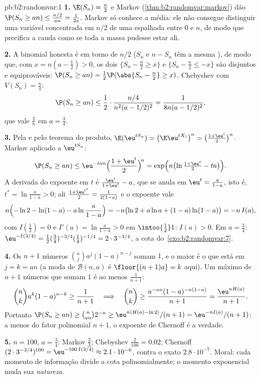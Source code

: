 \begin{solution}{pb:b2:randomvar:1}
\textbf{1.} $\E(S_n) = \frac n2$ e Markov
(\cref{thm:b2:randomvar:markov}) dão $\P(S_n \geq an) \leq
\frac{n/2}{an} = \frac1{2a}$. Markov só conhece a média: ele
não consegue distinguir uma variável concentrada em $n/2$ de uma
espalhada entre $0$ e $n$, de modo que precifica a cauda como se toda
a massa pudesse estar ali.

\textbf{2.} A binomial honesta é  em torno de $n/2$
($S_n$ e $n - S_n$ têm a mesma ), de modo que, com $x = n(a -
\frac12) > 0$, os dois  $\{S_n - \frac n2 \geq x\}$ e
$\{S_n - \frac n2 \leq -x\}$ são disjuntos e equiprováveis:
$\P(S_n \geq an) = \frac12\P(\abs{S_n - \frac n2} \geq x)$.
Chebyshev com $V(S_n) = \frac n4$:
\[
\P(S_n \geq an)
\leq \frac12\cdot\frac{n/4}{n^2(a - 1/2)^2}
= \frac1{8n(a - 1/2)^2},
\]
que vale $\frac2n$ em $a = \frac34$.

\textbf{3.} Pela  e pelo teorema do produto,
$\E(\eu^{tS_n}) = \bigl(\E \eu^{tX_1}\bigr)^n = \bigl(\frac{1
+ \eu^t}2\bigr)^n$. Markov aplicado a $\eu^{tS_n}$:
\[
\P(S_n \geq an) \leq \eu^{-tan}\Bigl(\frac{1 +
\eu^t}2\Bigr)^{\!n} = \exp\Bigl(n\bigl(\ln\tfrac{1 +
\eu^t}2 - ta\bigr)\Bigr).
\]
A derivada do expoente em $t$ é $\frac{\eu^t}{1 + \eu^t}
- a$, que se anula em $\eu^t = \frac a{1-a}$, isto é, $t^* =
\ln\frac a{1-a} > 0$; ali $\frac{1 + \eu^{t^*}}2 =
\frac1{2(1-a)}$ e o expoente vale
\[
n\Bigl(-\ln 2 - \ln(1-a) - a\ln\frac a{1-a}\Bigr)
= -n\bigl(\ln2 + a\ln a + (1-a)\ln(1-a)\bigr) = -n\,I(a),
\]
com $I(\frac12) = 0$ e $I'(a) = \ln\frac a{1-a} > 0$ em
$\intoo{\frac12}1$: $I(a) > 0$. Em $a = \frac34$:
$\eu^{-I(3/4)} = \frac12(\tfrac34)^{-3/4}(\tfrac14)^{-1/4} =
2\cdot3^{-3/4}$, a cota do~\cref{exo:b2:randomvar:7}.

\textbf{4.} Os $n + 1$ números $\binom nja^j(1-a)^{n-j}$ somam
$1$, e o maior é o que está em $j = k = an$ (a moda
de $\mathcal B(n, a)$ é $\floor{(n+1)a} = k$ aqui). Um
máximo de $n + 1$ números que somam $1$ é ao menos
$\frac1{n+1}$:
\[
\binom nk a^k(1-a)^{n-k} \geq \frac1{n+1}
\quad\Longrightarrow\quad
\binom nk \geq \frac{a^{-an}(1-a)^{-n(1-a)}}{n+1}
= \frac{\eu^{nH(a)}}{n+1}.
\]
Portanto $\P(S_n \geq an) \geq \binom{n}{an}2^{-n} \geq
\eu^{n(H(a) - \ln2)}/(n+1) = \eu^{-nI(a)}/(n+1)$: a menos do
fator polinomial $n + 1$, o expoente de Chernoff é a verdade.

\textbf{5.} $n = 100$, $a = \frac34$: Markov $\frac23$;
Chebyshev $\frac2{100} = 0.02$; Chernoff
$(2\cdot3^{-3/4})^{100} = \eu^{-100\,I(3/4)} \approx
2.1\cdot10^{-6}$, contra o exato $2.8\cdot10^{-7}$. Moral:
cada momento de informação divide a cota polinomialmente;
o momento exponencial muda sua \emph{natureza}.


\end{solution}
